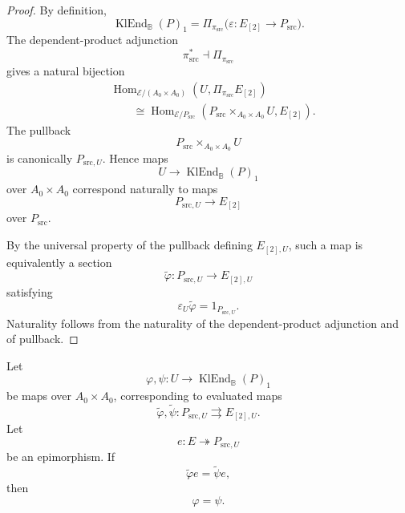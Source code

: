 \begin{proof}
    By definition,
    \[
        \operatorname{KlEnd}_{\mathbb B}(P)_1
        =
        \Pi_{\pi_{\mathrm{src}}}
        \bigl(
            \varepsilon:E_{[2]}\to P_{\mathrm{src}}
        \bigr).
    \]
    The dependent-product adjunction
    \[
        \pi_{\mathrm{src}}^*
        \dashv
        \Pi_{\pi_{\mathrm{src}}}
    \]
    gives a natural bijection
    \[
    \begin{aligned}
        &\operatorname{Hom}_{\mathcal E/(A_0\times A_0)}
        \left(
            U,
            \Pi_{\pi_{\mathrm{src}}}E_{[2]}
        \right)
        \\
        &\qquad\cong
        \operatorname{Hom}_{\mathcal E/P_{\mathrm{src}}}
        \left(
            P_{\mathrm{src}}
            \times_{A_0\times A_0}
            U,
            E_{[2]}
        \right).
    \end{aligned}
    \]
    The pullback
    \[
        P_{\mathrm{src}}
        \times_{A_0\times A_0}
        U
    \]
    is canonically \(P_{\mathrm{src},U}\). Hence maps
    \[
        U\to
        \operatorname{KlEnd}_{\mathbb B}(P)_1
    \]
    over \(A_0\times A_0\) correspond naturally to maps
    \[
        P_{\mathrm{src},U}
        \to
        E_{[2]}
    \]
    over \(P_{\mathrm{src}}\).

    By the universal property of the pullback defining \(E_{[2],U}\), such a
    map is equivalently a section
    \[
        \widetilde\varphi:
        P_{\mathrm{src},U}
        \to
        E_{[2],U}
    \]
    satisfying
    \[
        \varepsilon_U\widetilde\varphi
        =
        1_{P_{\mathrm{src},U}}.
    \]
    Naturality follows from the naturality of the dependent-product
    adjunction and of pullback.
\end{proof}

\begin{lemma}
\label{lem:to-regular-epi-extensionality}
    Let
    \[
        \varphi,\psi:
        U\to
        \operatorname{KlEnd}_{\mathbb B}(P)_1
    \]
    be maps over \(A_0\times A_0\), corresponding to evaluated maps
    \[
        \widetilde\varphi,\widetilde\psi:
        P_{\mathrm{src},U}
        \rightrightarrows
        E_{[2],U}.
    \]
    Let
    \[
        e:E\twoheadrightarrow P_{\mathrm{src},U}
    \]
    be an epimorphism. If
    \[
        \widetilde\varphi e
        =
        \widetilde\psi e,
    \]
    then
    \[
        \varphi=\psi.
    \]
\end{lemma}

